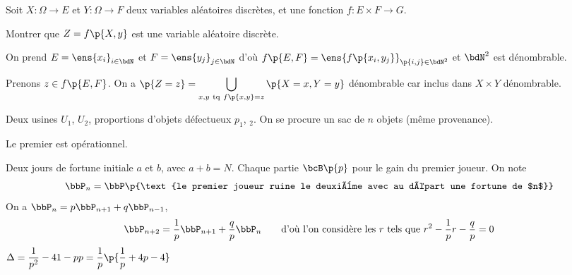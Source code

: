 \documentclass[a4paper,french,bookmarks]{book}
\begin{document}
    \newpage
    
    Soit $X : \Omega \to E$ et $Y : \Omega \to F$ deux variables aléatoires discrètes, et une fonction $f : E \times F \to G$.
    
    Montrer que $Z = f\p{X, y}$ est une variable aléatoire discrète.\bigskip
    
    On prend $E = \ens{x_i}_{i \in \bdN}$ et $F = \ens{y_j}_{j \in \bdN}$ d'où $f\p{E, F} = \ens{f\p{x_i, y_j}}_{\p{i, j} \in \bdN^2}$ et $\bdN^2$ est dénombrable.
    
    Prenons $z \in f\p{E, F}$. On a $\p{Z = z} = \displaystyle\bigcup_{x, y \ \text{tq} \ f\p{x, y} = z} \p{X =x, Y = y}$ dénombrable car inclus dans $X \times Y$ dénombrable.\newpage
    
    Deux usines $U_1$, $U_2$, proportions d'objets défectueux $p_1$, $_2$. On se procure un sac de $n$ objets (même provenance). 
    
    Le premier est opérationnel.\newpage
    
    Deux jours de fortune initiale $a$ et $b$, avec $a + b = N$. Chaque partie $\bcB\p{p}$ pour le gain du premier joueur. On note 
    \[ \bbP_n = \bbP\p{\text{le premier joueur ruine le deuxième avec au départ une fortune de $n$}} \]
    On a $\bbP_n = p\bbP_{n+1} + q\bbP_{n-1}$, \ie 
    \[\bbP_{n+2} = \dfrac{1}{p}\bbP_{n+1} + \dfrac{q}{p}\bbP_n \qquad\text{d'où l'on considère les $r$ tels que}\ r^2 - \dfrac{1}{p}r - \dfrac{q}{p} = 0\]
    $\Delta = \dfrac{1}{p^2} - 4{1-p}{p} = \dfrac{1}{p}\p{\dfrac{1}{p} + 4p - 4}$
\end{document}
